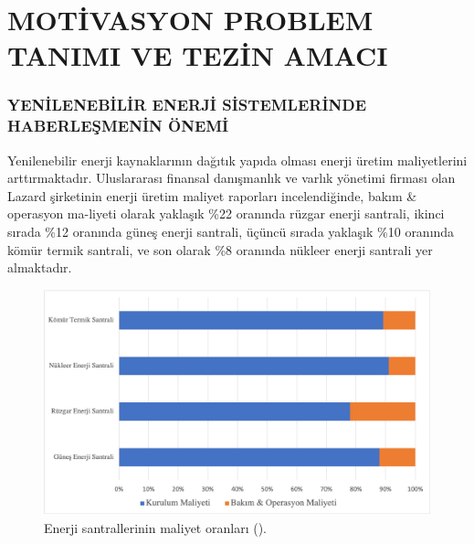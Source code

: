 \part{MOTİVASYON PROBLEM TANIMI VE TEZİN AMACI}
\thispagestyle{empty}
\newpage
\section{YENİLENEBİLİR ENERJİ SİSTEMLERİNDE HABERLEŞMENİN ÖNEMİ} \label{onem}




Yenilenebilir enerji kaynaklarının dağıtık yapıda olması enerji üretim maliyetlerini arttırmaktadır. Uluslararası finansal danışmanlık ve varlık yönetimi firması olan Lazard şirketinin enerji üretim maliyet raporları incelendiğinde, bakım \& operasyon ma-liyeti olarak yaklaşık \%22 oranında rüzgar enerji santrali, ikinci sırada \%12 oranında güneş enerji santrali, üçüncü sırada yaklaşık \%10 oranında kömür termik santrali, ve son olarak \%8 oranında nükleer enerji santrali yer almaktadır.


\begin{figure}[htbp]
\centerline{\includegraphics[width=\columnwidth]{Resim/chartbar.png}}
\caption{Enerji santrallerinin maliyet oranları (\protect{}).}
\label{fig:Lazards}
\end{figure}






